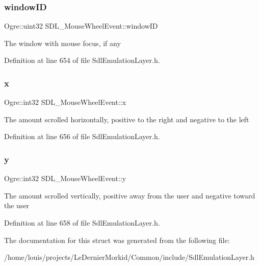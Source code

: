 \subsubsection{\texorpdfstring{window\+ID}{windowID}}
{\footnotesize\ttfamily Ogre\+::uint32 S\+D\+L\+\_\+\+Mouse\+Wheel\+Event\+::window\+ID}

The window with mouse focus, if any 

Definition at line 654 of file Sdl\+Emulation\+Layer.\+h.

\mbox{\label{struct_s_d_l___mouse_wheel_event_aeeed8bd6eaf755b8070af04f6fae690a}} 
\subsubsection{\texorpdfstring{x}{x}}
{\footnotesize\ttfamily Ogre\+::int32 S\+D\+L\+\_\+\+Mouse\+Wheel\+Event\+::x}

The amount scrolled horizontally, positive to the right and negative to the left 

Definition at line 656 of file Sdl\+Emulation\+Layer.\+h.

\mbox{\label{struct_s_d_l___mouse_wheel_event_a7907297ede875bc78f9cf38f51f22b72}} 
\subsubsection{\texorpdfstring{y}{y}}
{\footnotesize\ttfamily Ogre\+::int32 S\+D\+L\+\_\+\+Mouse\+Wheel\+Event\+::y}

The amount scrolled vertically, positive away from the user and negative toward the user 

Definition at line 658 of file Sdl\+Emulation\+Layer.\+h.



The documentation for this struct was generated from the following file\+:\begin{DoxyCompactItemize}
\item 
/home/louis/projects/\+Le\+Dernier\+Morkid/\+Common/include/Sdl\+Emulation\+Layer.\+h\end{DoxyCompactItemize}
